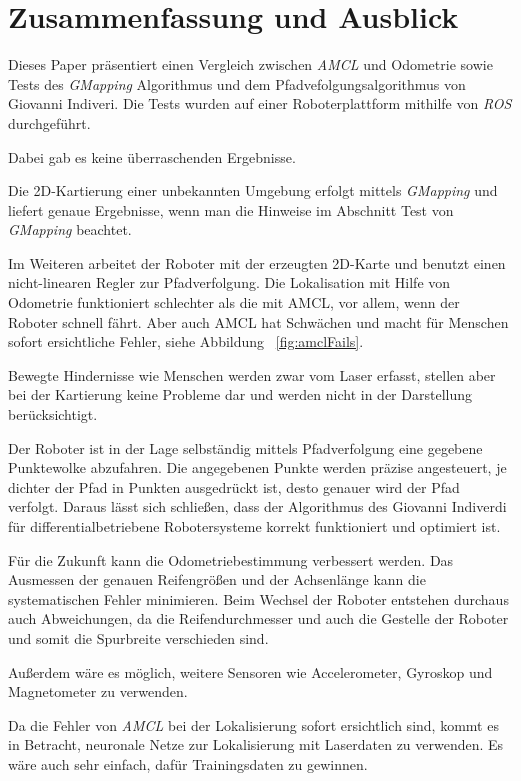 \documentclass[11pt,a4paper]{article}
\begin{document}
{\section{Zusammenfassung und Ausblick}

Dieses Paper pr\"asentiert einen Vergleich zwischen \textit{AMCL} und Odometrie sowie Tests des \textit{GMapping} Algorithmus und dem Pfadvefolgungsalgorithmus von Giovanni Indiveri. Die Tests wurden auf einer Roboterplattform mithilfe von \textit{ROS} durchgef\"uhrt. 


Dabei gab es keine \"uberraschenden Ergebnisse.

Die 2D-Kartierung einer unbekannten Umgebung erfolgt mittels \textit{GMapping} und liefert genaue Ergebnisse, wenn man die Hinweise im Abschnitt Test von \textit{ GMapping} beachtet.


Im Weiteren arbeitet der Roboter mit der erzeugten 2D-Karte und benutzt einen nicht-linearen Regler zur Pfadverfolgung.
Die Lokalisation mit Hilfe von Odometrie funktioniert schlechter als die mit AMCL, vor allem, wenn der Roboter schnell f\"ahrt. Aber auch AMCL hat Schw\"achen und macht f\"ur Menschen sofort ersichtliche Fehler, siehe Abbildung  ~\ref{fig:amclFails}.

Bewegte Hindernisse wie Menschen werden zwar vom Laser erfasst, stellen aber bei der Kartierung keine Probleme dar und werden nicht in der Darstellung ber\"ucksichtigt. 

Der Roboter ist in der Lage selbst\"andig mittels Pfadverfolgung eine gegebene Punktewolke abzufahren. Die angegebenen Punkte werden pr\"azise angesteuert, je dichter der Pfad in Punkten ausgedr\"uckt ist, desto genauer wird der Pfad verfolgt. Daraus l\"asst sich schlie{\ss}en, dass der Algorithmus des Giovanni Indiverdi f\"ur differentialbetriebene Robotersysteme korrekt funktioniert und optimiert ist.

F\"ur die Zukunft kann die Odometriebestimmung verbessert werden. Das Ausmessen der genauen Reifengr\"o{\ss}en und der Achsenl\"ange kann die systematischen Fehler minimieren. 
Beim Wechsel der Roboter entstehen durchaus auch Abweichungen, da die Reifendurchmesser und auch die Gestelle der Roboter und somit die Spurbreite verschieden sind.

Au{\ss}erdem w\"are es m\"oglich, weitere Sensoren wie Accelerometer, Gyroskop und Magnetometer zu verwenden. 

Da die Fehler von \textit{AMCL} bei der Lokalisierung sofort ersichtlich sind, kommt es in Betracht, neuronale Netze zur Lokalisierung mit Laserdaten zu verwenden. Es w\"are auch sehr einfach, daf\"ur Trainingsdaten zu gewinnen.

}
\end{document}
